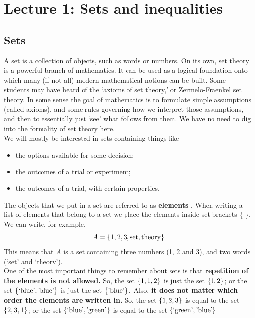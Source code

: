 \chapter{Lecture 1: Sets and inequalities}
\section{Sets} \label{axioms}
A set \label{set} is a collection of objects, such as words or numbers. On its own, set theory is a powerful branch of mathematics. It can be used as a logical foundation onto which many (if not all) modern mathematical notions can be built. Some students may have heard of the `axioms of set theory,' or Zermelo-Fraenkel set theory. In some sense the goal of mathematics is to formulate simple assumptions (called axioms), and some rules governing how we interpret those assumptions, and then to essentially just `see' what follows from them. We have no need to dig into the formality of set theory here. \\

We will mostly be interested in sets containing things like
\begin{itemize}
\item
the options available for some decision;
\item
the outcomes of a trial or experiment;
\item
the outcomes of a trial, with certain properties.
\end{itemize}
The objects that we put in a set are referred to as \textbf{elements} \label{element}. When writing a list of elements that belong to a set we place the elements inside set brackets \{ \}. \label{symbset} We can write, for example,
\[
A = \left\{1,2,3,\text{set},\text{theory}\right\}
\]
This means that $A$ is a set containing three numbers (1, 2 and 3), and two words (`set' and `theory'). \\

\noindent One of the most important things to remember about sets is that \textbf{repetition of the elements is not allowed.} So, the set $\left\{1,1,2\right\}$ is just the set $\left\{1,2\right\}$; or the set $\left\{\text{`blue'},\text{'blue'}\right\}$ is just the set $\left\{\text{'blue'}\right\}.$ Also, \textbf{it does not matter which order the elements are written in.} So, the set $\left\{1,2,3\right\}$ is equal to the set $\left\{2,3,1\right\}$; or the set  $\left\{\text{`blue'},\text{'green'}\right\}$ is equal to the set $\left\{\text{`green'},\text{'blue'}\right\}$\\


